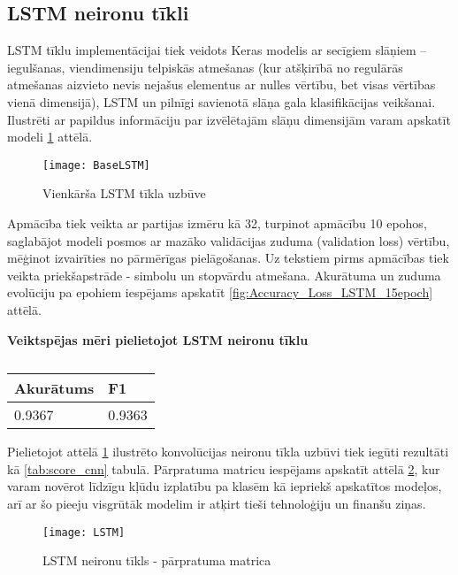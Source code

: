\pagebreak

\subsection{LSTM neironu tīkli}
LSTM tīklu implementācijai tiek veidots Keras modelis ar secīgiem slāņiem – iegulšanas, viendimensiju telpiskās atmešanas (kur atšķirībā no regulārās atmešanas aizvieto nevis nejašus elementus ar nulles vērtību, bet visas vērtības vienā dimensijā), LSTM  un pilnīgi savienotā slāņa gala klasifikācijas veikšanai. Ilustrēti ar papildus informāciju par izvēlētajām slāņu dimensijām varam apskatīt modeli \ref{fig:BaseLSTM} attēlā.

\begin{figure}[H]
\centering
\texttt{[image: BaseLSTM]}
\caption{Vienkārša LSTM tīkla uzbūve}
\label{fig:BaseLSTM}
\end{figure}

Apmācība tiek veikta ar partijas izmēru kā 32, turpinot apmācību 10 epohos, saglabājot modeli posmos ar mazāko validācijas zuduma (validation loss) vērtību, mēģinot izvairīties no pārmērīgas pielāgošanas. Uz tekstiem pirms apmācības tiek veikta priekšapstrāde - simbolu un stopvārdu atmešana. Akurātuma un zuduma evolūciju pa epohiem iespējams apskatīt \ref{fig:Accuracy_Loss_LSTM_15epoch} attēlā.

\begin{table}[H]
\centering
\caption{\label{tab:score_lstm}}
\textbf{Veiktspējas mēri pielietojot LSTM neironu tīklu\\}
\begin{tabular}{|l|l|}
\hline
Akurātums & F1 \\ \hline
0.9367 & 0.9363 \\ \hline
\end{tabular}
\end{table}

Pielietojot attēlā \ref{fig:BaseLSTM} ilustrēto konvolūcijas neironu tīkla uzbūvi tiek iegūti rezultāti kā \ref{tab:score_cnn} tabulā. Pārpratuma matricu iespējams apskatīt attēlā \ref{fig:LSTM}, kur varam novērot līdzīgu kļūdu izplatību pa klasēm kā iepriekš apskatītos modeļos, arī ar šo pieeju visgrūtāk modelim ir atķirt tieši tehnoloģiju un finanšu ziņas.

\begin{figure}[H]
\centering
\texttt{[image: LSTM]}
\caption{LSTM neironu tīkls - pārpratuma matrica}
\label{fig:LSTM}
\end{figure}

